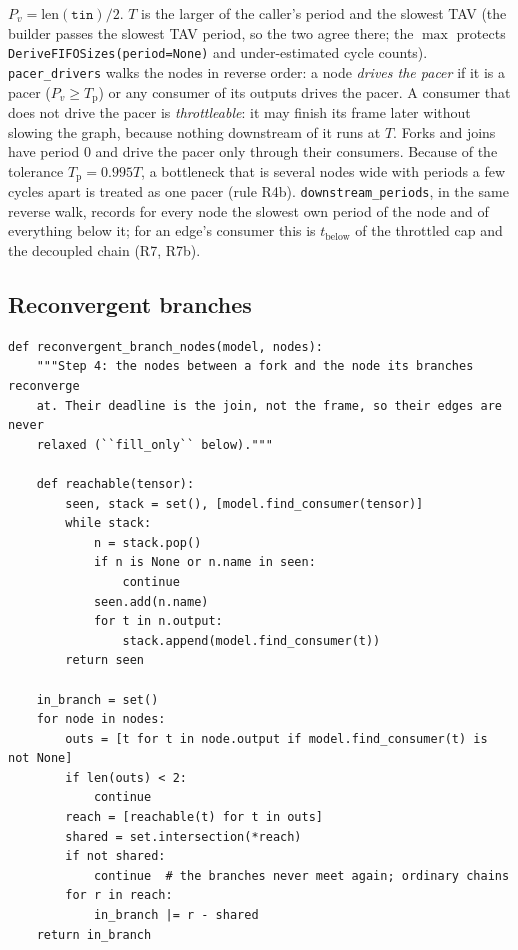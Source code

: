 \documentclass[10pt,a4paper]{article}
\newcommand{\code}[1]{\texttt{#1}}
\newcommand{\Tg}{T}           %
\newcommand{\Tp}{T_{\mathrm{p}}} %
\begin{document}
$P_v=\mathrm{len}(\code{tin})/2$. $\Tg$ is the larger of the caller's period and the
slowest TAV (the builder passes the slowest TAV period, so the two agree there;
the $\max$ protects \code{DeriveFIFOSizes(period=None)} and under-estimated
cycle counts). \code{pacer\_drivers} walks the nodes in reverse order: a node
\emph{drives the pacer} if it is a pacer ($P_v \ge \Tp$) or any consumer of its
outputs drives the pacer. A consumer that does not drive the pacer is
\emph{throttleable}: it may finish its frame later without slowing the graph,
because nothing downstream of it runs at $\Tg$. Forks and joins have period 0 and
drive the pacer only through their consumers. Because of the tolerance
$\Tp=0.995\Tg$, a bottleneck that is several nodes wide with periods a few cycles
apart is treated as one pacer (rule R4b). \code{downstream\_periods}, in the same
reverse walk, records for every node the slowest own period of the node and of
everything below it; for an edge's consumer this is $t_{\mathrm{below}}$ of the
throttled cap and the decoupled chain (R7, R7b).

\subsection{Reconvergent branches}

\begin{lstlisting}[firstnumber=662,title={\texttt{src/finn/transformation/fpgadataflow/derive\_characteristic.py}, lines 662--689}]
def reconvergent_branch_nodes(model, nodes):
    """Step 4: the nodes between a fork and the node its branches reconverge
    at. Their deadline is the join, not the frame, so their edges are never
    relaxed (``fill_only`` below)."""

    def reachable(tensor):
        seen, stack = set(), [model.find_consumer(tensor)]
        while stack:
            n = stack.pop()
            if n is None or n.name in seen:
                continue
            seen.add(n.name)
            for t in n.output:
                stack.append(model.find_consumer(t))
        return seen

    in_branch = set()
    for node in nodes:
        outs = [t for t in node.output if model.find_consumer(t) is not None]
        if len(outs) < 2:
            continue
        reach = [reachable(t) for t in outs]
        shared = set.intersection(*reach)
        if not shared:
            continue  # the branches never meet again; ordinary chains
        for r in reach:
            in_branch |= r - shared
    return in_branch
\end{lstlisting}
\end{document}
